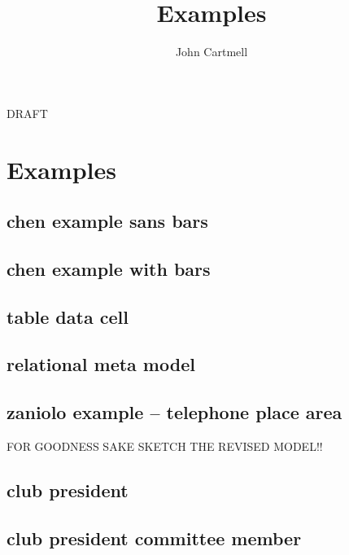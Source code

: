 \documentclass[10pt,a4paper]{article}
\begin{document}
\title{Examples}


\author{John Cartmell}

\maketitle
\begin{center}
DRAFT
\end{center}

\appendix
\section{Examples}

\subsection{chen example sans bars}



\subsection{chen example with bars}


\subsection{table data cell}


\subsection{relational meta model}




\subsection{zaniolo example -- telephone place area}

FOR GOODNESS SAKE SKETCH THE REVISED MODEL!!

\subsection{club president}


\subsection{club president committee member}

\end{document}
